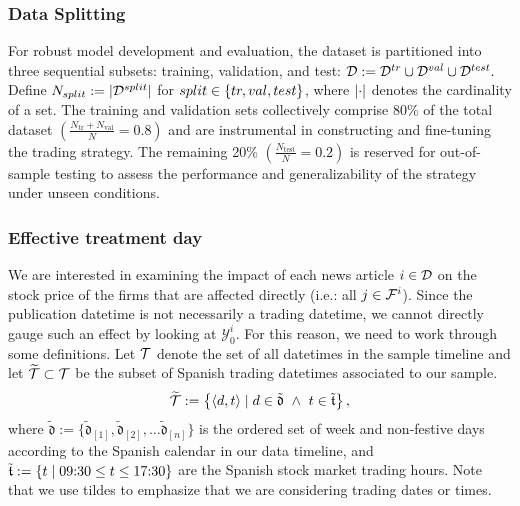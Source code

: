\subsubsection*{Data Splitting}
For robust model development and evaluation, the dataset is partitioned into three sequential subsets: training, validation, and test:
$
\mathcal{D} := \mathcal{D}^{tr} \cup \mathcal{D}^{val} \cup \mathcal{D}^{test}.
$
Define $N_{split}:=|\mathcal{D}^{split}|$ for $split\in\left\{tr,val,test\right\}$, where $\left|\cdot\right|$ denotes the cardinality of a set. 
The training and validation sets collectively comprise 80\% of the total dataset $(\frac{N_{\text{tr}} + N_{\text{val}}}{N} = 0.8)$ and are instrumental in constructing and fine-tuning the trading strategy. The remaining 20\% $(\frac{N_{\text{test}}}{N} = 0.2)$ is reserved for out-of-sample testing to assess the performance and generalizability of the strategy under unseen conditions.

\subsubsection*{Effective treatment day}
\hspace{0.5cm} We are interested in examining the impact of each news article $i\in\mathcal{D}$ on the stock price of the firms that are affected directly (i.e.: all $j\in\mathcal{F}^i$). Since the publication datetime is not necessarily a trading datetime, we cannot directly gauge such an effect by looking at $\mathcal Y_0^i$. 
For this reason, we need to work through some definitions. 
%
%
Let $\mathcal{T}$ denote the set of all datetimes in the sample timeline and let $\widetilde{\mathcal{T}}\subset \mathcal{T}$ be the subset of Spanish trading datetimes associated to our sample.
\begin{align*}
\widetilde{\mathcal{T}} := 
\left\{\langle d,t \rangle \mid d \in \tilde{\mathfrak d} ~\wedge~ t\in \tilde{\mathfrak t}\right\}
,
\end{align*}
where 
$
\tilde{\mathfrak{d}}:=\{\tilde{\mathfrak{d}}_{[1]},\tilde{\mathfrak{d}}_{[2]}, \ldots \tilde{\mathfrak{d}}_{[n]}\}
$
is the ordered set of week and non-festive days according to the Spanish calendar in our data timeline,
and 
$\tilde{\mathfrak t}:=
\{t \mid \text{09:30} \leq t \leq  \text{17:30}\}
$
 are the Spanish stock market trading hours. 
Note that we use tildes to emphasize that we are considering trading dates or times. 

